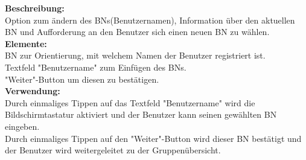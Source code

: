 \textbf{Beschreibung:}\\
Option zum ändern des BNs(Benutzernamen), Information über den aktuellen BN und Aufforderung an den Benutzer sich einen neuen BN zu wählen.\\
\textbf{Elemente:}\\
BN zur Orientierung, mit welchem Namen der Benutzer registriert ist.\\
Textfeld "Benutzername" zum Einfügen des BNs.\\
"Weiter"-Button um diesen zu bestätigen.\\
\textbf{Verwendung:}\\
Durch einmaliges Tippen auf das Textfeld "Benutzername" wird die Bildschirmtastatur aktiviert und der Benutzer kann seinen gewählten BN eingeben.\\
Durch einmaliges Tippen auf den "Weiter"-Button wird dieser BN bestätigt und der Benutzer wird weitergeleitet zu der Gruppenübersicht.

\clearpage
